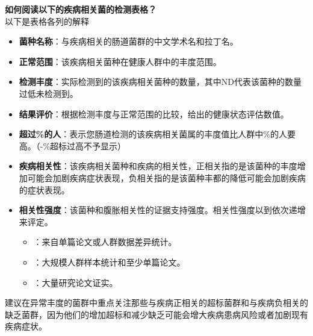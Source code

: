 \documentclass[UTF8]{ctexart}
\begin{document}
\begin{tcolorbox}[
    enhanced,
    colback=lightpurple!10, %
    colframe=lightpurple!10,  %
    arc=3mm,
    boxrule=0.5pt,
    width=\textwidth,
    top=8pt,
    bottom=8pt
]
{\small{\color{lightpurple}\faQuestionCircle}\quad \textbf{如何阅读以下的疾病相关菌的检测表格？}\\
{\color{orange!50}\faComments}\quad 以下是表格各列的解释
\begin{itemize}
    \item \textbf{菌种名称}：与疾病相关的肠道菌群的中文学术名和拉丁名。
    \item \textbf{正常范围}：该疾病相关菌种在健康人群中的丰度范围。
    \item \textbf{检测丰度}：实际检测到的该疾病相关菌种的数量，其中ND代表该菌种的数量过低未检测到。
    \item \textbf{结果评价}：根据检测丰度与正常范围的比较，给出的健康状态评估数值。
    \item \textbf{超过\%的人}：表示您肠道检测的该疾病相关菌属的丰度值比人群中\%的人要高。（-\%超标过高不予显示）
    \item \textbf{疾病相关性}：该疾病相关菌种和疾病的相关性，正相关指的是该菌种的丰度增加可能会加剧疾病症状表现，负相关指的是该菌种丰都的降低可能会加剧疾病的症状表现。
    \item \textbf{相关性强度}：该菌种和腹胀相关性的证据支持强度。相关性强度以{\small\color{lightgray}\faStar}到{\small\color{lightgray}\faStar \faStar \faStar}依次递增来评定。
    \begin{itemize}
        \item \small{\color{lightgray}\faStar}：来自单篇论文或人群数据差异统计。
        \item \small{\color{lightgray}\faStar\faStar}：大规模人群样本统计和至少单篇论文。
        \item \small{\color{lightgray}\faStar\faStar\faStar}：大量研究论文证实。
    \end{itemize}
\end{itemize}
建议在异常丰度的菌群中重点关注那些与疾病正相关的超标菌群和与疾病负相关的缺乏菌群，因为他们的增加超标和减少缺乏可能会增大疾病患病风险或者加剧现有疾病症状。
}
\end{tcolorbox}

\newpage

\end{document}

